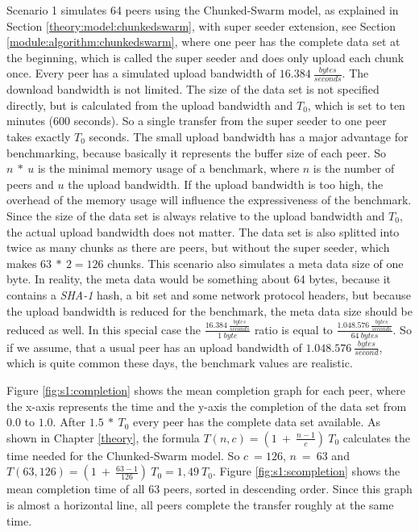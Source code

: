 Scenario 1 simulates 64 peers using the Chunked-Swarm model, as explained in Section \ref{theory:model:chunkedswarm}, with super seeder extension, see Section \ref{module:algorithm:chunkedswarm}, where one peer has the complete data set at the beginning, which is called the super seeder and does only upload each chunk once. Every peer has a simulated upload bandwidth of $16.384\:\frac{bytes}{seconds}$. The download bandwidth is not limited. The size of the data set is not specified directly, but is calculated from the upload bandwidth and $T_0$, which is set to ten minutes (600 seconds). So a single transfer from the super seeder to one peer takes exactly $T_0$ seconds. The small upload bandwidth has a major advantage for benchmarking, because basically it represents the buffer size of each peer. So $n\:*\:u$ is the minimal memory usage of a benchmark, where $n$ is the number of peers and $u$ the upload bandwidth. If the upload bandwidth is too high, the overhead of the memory usage will influence the expressiveness of the benchmark. Since the size of the data set is always relative to the upload bandwidth and $T_0$, the actual upload bandwidth does not matter. The data set is also splitted into twice as many chunks as there are peers, but without the super seeder, which makes $63\:*\:2=126$ chunks. This scenario also simulates a meta data size of one byte. In reality, the meta data would be something about 64 bytes, because it contains a \emph{SHA-1} hash, a bit set and some network protocol headers, but because the upload bandwidth is reduced for the benchmark, the meta data size should be reduced as well. In this special case the $\frac{16.384\:\frac{bytes}{seconds}}{1\:byte}$ ratio is equal to $\frac{1.048.576\:\frac{bytes}{seconds}}{64\:bytes}$. So if we assume, that a usual peer has an upload bandwidth of $1.048.576\:\frac{bytes}{second}$, which is quite common these days, the benchmark values are realistic.

Figure \ref{fig:s1:completion} shows the mean completion graph for each peer, where the x-axis represents the time and the y-axis the completion of the data set from $0.0$ to $1.0$. After $1.5\:*\:T_0$ every peer has the complete data set available. As shown in Chapter \ref{theory}, the formula $T(n, c) = (1\:+\:\frac{n-1}{c})\:T_0$ calculates the time needed for the Chunked-Swarm model. So $c\:=126$, $n\:=\:63$ and $T(63, 126) = (1\:+\:\frac{63-1}{126})\:T_0 = 1,49\:T_0$. Figure \ref{fig:s1:scompletion} shows the mean completion time of all 63 peers, sorted in descending order. Since this graph is almost a horizontal line, all peers complete the transfer roughly at the same time.

